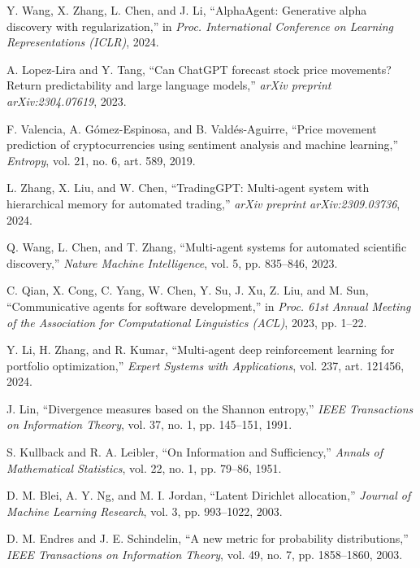 \begin{thebibliography}{99}
Y. Wang, X. Zhang, L. Chen, and J. Li,
``AlphaAgent: Generative alpha discovery with regularization,''
in \textit{Proc. International Conference on Learning Representations (ICLR)}, 2024.

A. Lopez-Lira and Y. Tang,
``Can ChatGPT forecast stock price movements? Return predictability and large language models,''
\textit{arXiv preprint arXiv:2304.07619}, 2023.

F. Valencia, A. Gómez-Espinosa, and B. Valdés-Aguirre,
``Price movement prediction of cryptocurrencies using sentiment analysis and machine learning,''
\textit{Entropy}, vol. 21, no. 6, art. 589, 2019.

L. Zhang, X. Liu, and W. Chen,
``TradingGPT: Multi-agent system with hierarchical memory for automated trading,''
\textit{arXiv preprint arXiv:2309.03736}, 2024.

Q. Wang, L. Chen, and T. Zhang,
``Multi-agent systems for automated scientific discovery,''
\textit{Nature Machine Intelligence}, vol. 5, pp. 835--846, 2023.

C. Qian, X. Cong, C. Yang, W. Chen, Y. Su, J. Xu, Z. Liu, and M. Sun,
``Communicative agents for software development,''
in \textit{Proc. 61st Annual Meeting of the Association for Computational Linguistics (ACL)}, 2023, pp. 1--22.

Y. Li, H. Zhang, and R. Kumar,
``Multi-agent deep reinforcement learning for portfolio optimization,''
\textit{Expert Systems with Applications}, vol. 237, art. 121456, 2024.

J. Lin,
``Divergence measures based on the Shannon entropy,''
\textit{IEEE Transactions on Information Theory}, vol. 37, no. 1, pp. 145--151, 1991.

S. Kullback and R. A. Leibler,
``On Information and Sufficiency,''
\textit{Annals of Mathematical Statistics}, vol. 22, no. 1, pp. 79--86, 1951.

D. M. Blei, A. Y. Ng, and M. I. Jordan,
``Latent Dirichlet allocation,''
\textit{Journal of Machine Learning Research}, vol. 3, pp. 993--1022, 2003.

D. M. Endres and J. E. Schindelin,
``A new metric for probability distributions,''
\textit{IEEE Transactions on Information Theory}, vol. 49, no. 7, pp. 1858--1860, 2003.


\end{thebibliography}
